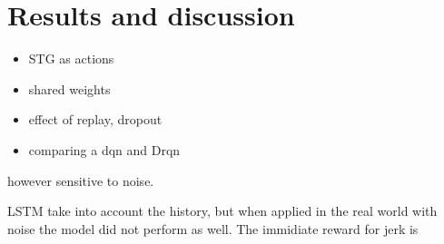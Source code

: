 \section{Results and discussion}
\begin{itemize}
  \item STG as actions
  \item shared weights
  \item effect of replay, dropout 
  \item comparing a dqn and Drqn 
\end{itemize}
however sensitive to noise. 

LSTM take into account the history, but when applied in the real world with noise the model did not perform as well. 
The immidiate reward for jerk is 

